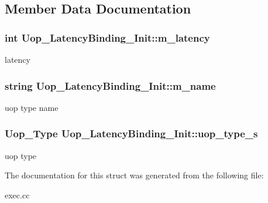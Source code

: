 \subsection{Member Data Documentation}
\hypertarget{structUop__LatencyBinding__Init_a20fe2b910b4498004be1d25050470d79}{
\subsubsection[{m\_\-latency}]{\setlength{\rightskip}{0pt plus 5cm}int {\bf Uop\_\-LatencyBinding\_\-Init::m\_\-latency}}}
\label{structUop__LatencyBinding__Init_a20fe2b910b4498004be1d25050470d79}
latency \hypertarget{structUop__LatencyBinding__Init_a629733a1a1bbaf31462e071124f528f7}{
\subsubsection[{m\_\-name}]{\setlength{\rightskip}{0pt plus 5cm}string {\bf Uop\_\-LatencyBinding\_\-Init::m\_\-name}}}
\label{structUop__LatencyBinding__Init_a629733a1a1bbaf31462e071124f528f7}
uop type name \hypertarget{structUop__LatencyBinding__Init_a489ee0c815812d2fa7df97788ce8838d}{
\subsubsection[{uop\_\-type\_\-s}]{\setlength{\rightskip}{0pt plus 5cm}Uop\_\-Type {\bf Uop\_\-LatencyBinding\_\-Init::uop\_\-type\_\-s}}}
\label{structUop__LatencyBinding__Init_a489ee0c815812d2fa7df97788ce8838d}
uop type 

The documentation for this struct was generated from the following file:\begin{DoxyCompactItemize}
\item 
exec.cc\end{DoxyCompactItemize}
